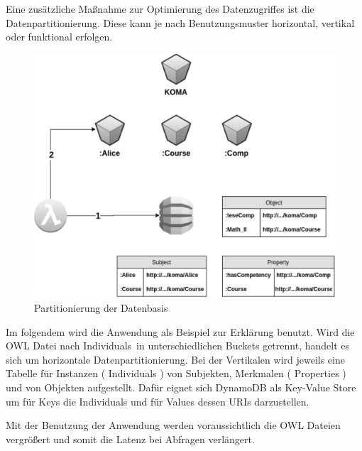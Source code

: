 \documentclass[
12pt,
english,
ngerman,
headsepline,
twoside,
openright,
numbers=noenddot,version=first
]{scrreprt}
\begin{document}
Eine zusätzliche Maßnahme zur Optimierung des Datenzugriffes ist die Datenpartitionierung. Diese kann je nach Benutzungsmuster horizontal, vertikal oder funktional erfolgen.
\begin{figure}[H]
	\begin{center}
		\includegraphics[scale=0.60]{./pics/parititioning.eps}	
		\caption{Partitionierung der Datenbasis}
		\label{pic:partitioning}
	\end{center}
\end{figure}
Im folgendem wird die Anwendung als Beispiel zur Erklärung benutzt.
Wird die \acrshort{OWL} Datei nach \glqq Individuals\grqq\ in unterschiedlichen Buckets getrennt, handelt es sich um horizontale Datenpartitionierung. Bei der Vertikalen wird jeweils eine Tabelle für Instanzen ( Individuals ) von  Subjekten, Merkmalen ( Properties ) und von Objekten aufgestellt. Dafür eignet sich DynamoDB als \glqq Key-Value Store\grqq\, um für Keys die Individuals und für Values dessen \acrfull{URI}s darzustellen.\cite{ontoVerticalPartition}


Mit der Benutzung der Anwendung werden voraussichtlich die \acrshort{OWL} Dateien vergrößert und somit die Latenz bei Abfragen verlängert.
\end{document}
